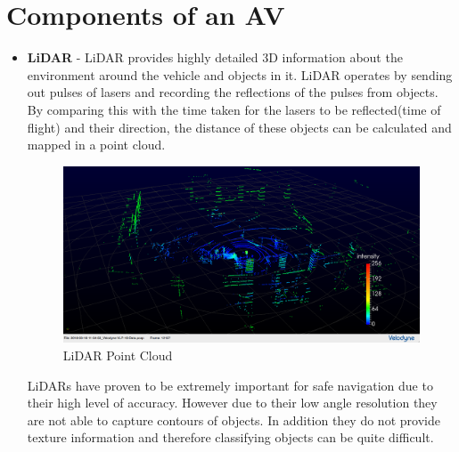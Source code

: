 \section{Components of an AV}

\begin{itemize}
	\item \textbf{LiDAR} - LiDAR provides highly detailed 3D information about the environment around the vehicle and objects in it. LiDAR operates by sending out pulses of lasers and recording the reflections of the pulses from objects. By comparing this with the time taken for the lasers to be reflected(time of flight) and their direction, the distance of these objects can be calculated and mapped in a point cloud. 
	 \begin{figure}[h]
		\centering
		\includegraphics[width=\textwidth]{images/sil.png}
		\caption{LiDAR Point Cloud}
		\label{fig:lidar}
	\end{figure}
	LiDARs have proven to be extremely important for safe navigation due to their high level of accuracy. However due to their low angle resolution they are not able to capture contours of objects. In addition they do not provide texture information and therefore classifying objects can be quite difficult. 
	

\end{itemize}
